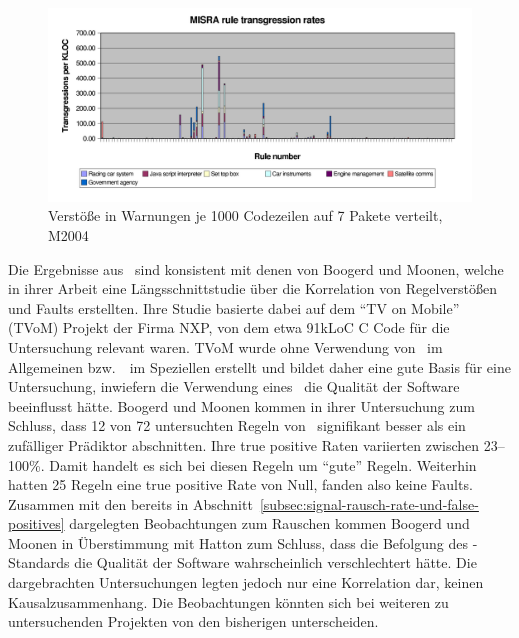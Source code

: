 \documentclass[a4paper,UKenglish,cleveref, autoref]{templates/lipics-v2019}
\begin{document}
    \begin{figure}[H]
        \centering
        \captionsetup{justification=centering,margin=2cm}
        \includegraphics[width=\textwidth]{graphics/2004-transgression-rates.png}
        \caption{Verstöße in Warnungen je 1000 Codezeilen auf 7 Pakete verteilt, M2004\cite{hatton2007language}}
        \label{fig:2004-transgression-rates}
    \end{figure}

    Die Ergebnisse aus~\cite{hatton2007language} sind konsistent mit denen von Boogerd und Moonen, welche in
    ihrer Arbeit eine Längsschnittstudie über die Korrelation von Regelverstößen und Faults erstellten.\cite{boogerd2008assessing}
    Ihre Studie basierte dabei auf dem \enquote{TV on Mobile} (TVoM) Projekt der Firma NXP, von dem etwa 91kLoC C Code
    für die Untersuchung relevant waren.
    TVoM wurde ohne Verwendung von \sqss\ im Allgemeinen bzw.\ \misra\ im Speziellen erstellt und bildet daher eine gute
    Basis für eine Untersuchung, inwiefern die Verwendung eines \sqss\ die Qualität der Software beeinflusst hätte.
    Boogerd und Moonen kommen in ihrer Untersuchung zum Schluss, dass 12 von 72 untersuchten Regeln von \misra\ signifikant
    besser als ein zufälliger Prädiktor abschnitten.
    Ihre true positive Raten variierten zwischen 23--100\%.
    Damit handelt es sich bei diesen Regeln um \enquote{gute} Regeln.
    Weiterhin hatten 25 Regeln eine true positive Rate von Null, fanden also keine Faults.
    Zusammen mit den bereits in Abschnitt~\ref{subsec:signal-rausch-rate-und-false-positives} dargelegten Beobachtungen zum
    Rauschen kommen Boogerd und Moonen in Überstimmung mit Hatton zum Schluss, dass die Befolgung des \misra-Standards
    die Qualität der Software wahrscheinlich verschlechtert hätte.
    Die dargebrachten Untersuchungen legten jedoch nur eine Korrelation dar, keinen Kausalzusammenhang.
    Die Beobachtungen könnten sich bei weiteren zu untersuchenden Projekten von den bisherigen unterscheiden.
\end{document}
